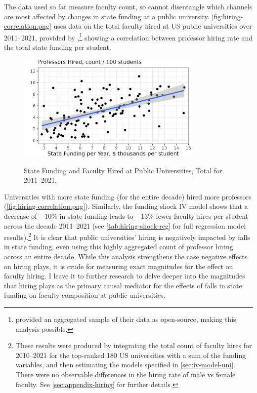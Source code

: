 The data used so far measure faculty count, so cannot disentangle which channels are most affected by changes in state funding at a public university.
\autoref{fig:hiring-correlation.png} uses data on the total faculty hired at US public universities over 2011--2021, provided by \cite{wapman2022quantifying},\footnote{
    \cite{wapman2022quantifying} provided an aggregated sample of their data as open-source, making this analysis possible.
} showing a correlation between professor hiring rate and the total state funding per student.
\begin{figure}[h!]
    \centering
    \singlespacing
    \caption{State Funding and Faculty Hired at Public Universities, Total for 2011--2021.}
    \includegraphics[width=0.8\textwidth]{figures/hiring-correlation.png}
    \label{fig:hiring-correlation.png}
\end{figure}

Universities with more state funding (for the entire decade) hired more professors (\autoref{fig:hiring-correlation.png}).
Similarly, the funding shock IV model shows that a decrease of $-10$\% in state funding leads to $-13$\% fewer faculty hires per student across the decade 2011--2021 (see \autoref{tab:hiring-shock-reg} for full regression model results).\footnote{
    These results were produced by integrating the total count of faculty hires for 2010--2021 for the top-ranked 180 US universities with a sum of the funding variables, and then estimating the models specified in \autoref{sec:iv-model-uni}.
    There were no observable differences in the hiring rate of male vs female faculty.
    See \autoref{sec:appendix-hiring} for further details.
}
It is clear that public universities' hiring is negatively impacted by falls in state funding, even using this highly aggregated count of professor hiring across an entire decade.
While this analysis strengthens the case negative effects on hiring plays, it is crude for measuring exact magnitudes for the effect on faculty hiring.
I leave it to further research to delve deeper into the magnitudes that hiring plays as the primary causal mediator for the effects of falls in state funding on faculty composition at public universities.

